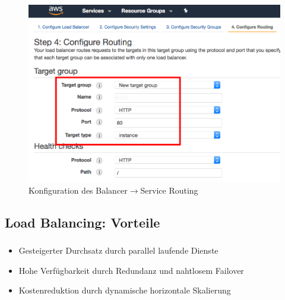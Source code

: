 \begin{frame}
    \frametitle{\insertsection}
    \framesubtitle{\insertsubsection}
	
	\vspace{-12pt} %
    \begin{figure}[h]
        \centering
        \includegraphics[height=0.65\textheight]{../images/aws-elb-routing}
        \caption{Konfiguration des Balancer$\rightarrow$Service Routing~\cite{bitnamiConfigureElastic}}
    \end{figure}
\end{frame}

\subsection{Load Balancing: Vorteile}
\begin{frame}
    \frametitle{\insertsection}
    \framesubtitle{\insertsubsection}

    \begin{itemize}
    	\item Gesteigerter Durchsatz durch parallel laufende Dienste
    	\item Hohe Verfügbarkeit durch Redundanz und nahtlosem Failover
    	\item Kostenreduktion durch dynamische horizontale Skalierung
    \end{itemize}
\end{frame}


